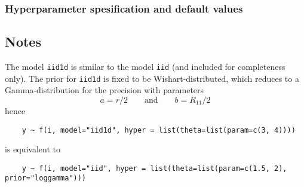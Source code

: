 \documentclass[a4paper,11pt]{article}
\begin{document}
\subsubsection*{Hyperparameter spesification and default values}


\subsection*{Notes}

The model \texttt{iid1d} is similar to the model \texttt{iid} (and
included for completeness only). The prior for \texttt{iid1d} is fixed
to be Wishart-distributed, which reduces to a Gamma-distribution for
the precision with parameters
\begin{displaymath}
    a = r/2 \qquad\text{and}\qquad b = R_{11}/2
\end{displaymath}
hence
\begin{verbatim}
    y ~ f(i, model="iid1d", hyper = list(theta=list(param=c(3, 4))))
\end{verbatim}
is equivalent to
\begin{verbatim}
    y ~ f(i, model="iid", hyper = list(theta=list(param=c(1.5, 2), prior="loggamma")))
\end{verbatim}
\end{document}
